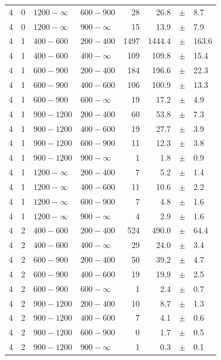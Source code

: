 \begin{table}[!h]
\begin{tabular}{rrllrrcl}
4 & 0 & $1200- \infty$ & $600-900$ &     28 &     26.8 &$\pm$&    8.7 \\
4 & 0 & $1200- \infty$ & $900-\infty$ &     15 &     13.9 &$\pm$&    7.9 \\
4\T & 1 & $ 400- 600$ & $200-400$ &   1497 &   1444.4 &$\pm$&  163.6 \\
4 & 1 & $ 400- 600$ & $400-\infty$ &    109 &    109.8 &$\pm$&   15.4 \\
4\T & 1 & $ 600- 900$ & $200-400$ &    184 &    196.6 &$\pm$&   22.3 \\
4 & 1 & $ 600- 900$ & $400-600$ &    106 &    100.9 &$\pm$&   13.3 \\
4 & 1 & $ 600- 900$ & $600-\infty$ &     19 &     17.2 &$\pm$&    4.9 \\
4\T & 1 & $ 900-1200$ & $200-400$ &     60 &     53.8 &$\pm$&    7.3 \\
4 & 1 & $ 900-1200$ & $400-600$ &     19 &     27.7 &$\pm$&    3.9 \\
4 & 1 & $ 900-1200$ & $600-900$ &     11 &     12.3 &$\pm$&    3.8 \\
4 & 1 & $ 900-1200$ & $900-\infty$ &      1 &      1.8 &$\pm$&    0.9 \\
4\T & 1 & $1200- \infty$ & $200-400$ &      7 &      5.2 &$\pm$&    1.4 \\
4 & 1 & $1200- \infty$ & $400-600$ &     11 &     10.6 &$\pm$&    2.2 \\
4 & 1 & $1200- \infty$ & $600-900$ &      7 &      4.8 &$\pm$&    1.6 \\
4 & 1 & $1200- \infty$ & $900-\infty$ &      4 &      2.9 &$\pm$&    1.6 \\
4\T & 2 & $ 400- 600$ & $200-400$ &    524 &    490.0 &$\pm$&   64.4 \\
4 & 2 & $ 400- 600$ & $400-\infty$ &     29 &     24.0 &$\pm$&    3.4 \\
4\T & 2 & $ 600- 900$ & $200-400$ &     50 &     39.2 &$\pm$&    4.7 \\
4 & 2 & $ 600- 900$ & $400-600$ &     19 &     19.9 &$\pm$&    2.5 \\
4 & 2 & $ 600- 900$ & $600-\infty$ &      1 &      2.4 &$\pm$&    0.7 \\
4\T & 2 & $ 900-1200$ & $200-400$ &     10 &      8.7 &$\pm$&    1.3 \\
4 & 2 & $ 900-1200$ & $400-600$ &      7 &      4.1 &$\pm$&    0.6 \\
4 & 2 & $ 900-1200$ & $600-900$ &      0 &      1.7 &$\pm$&    0.5 \\
4 & 2 & $ 900-1200$ & $900-\infty$ &      1 &      0.3 &$\pm$&    0.1 \\

\end{tabular}
\end{table}
